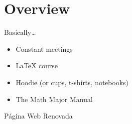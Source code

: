 \begin{frame}
    \maketitle
\end{frame}

\begin{frame}
    
\end{frame}

\section{Overview}

\begin{frame}{Basically\ldots}
    \begin{itemize}
        \item Constant meetings
        \item LaTeX course
        \item Hoodie (or cups, t-shirts, notebooks)
        \item The Math Major Manual
    \end{itemize}
\end{frame}

\begin{frame}{}
    \begin{center}
        Página Web Renovada
    \end{center}
\end{frame}